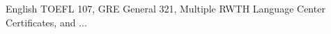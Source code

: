 
\begin{cvskills}

  \cvskill
    {English} %
    {TOEFL 107, GRE General 321, Multiple RWTH Language Center Certificates, and ...} %


\end{cvskills}
